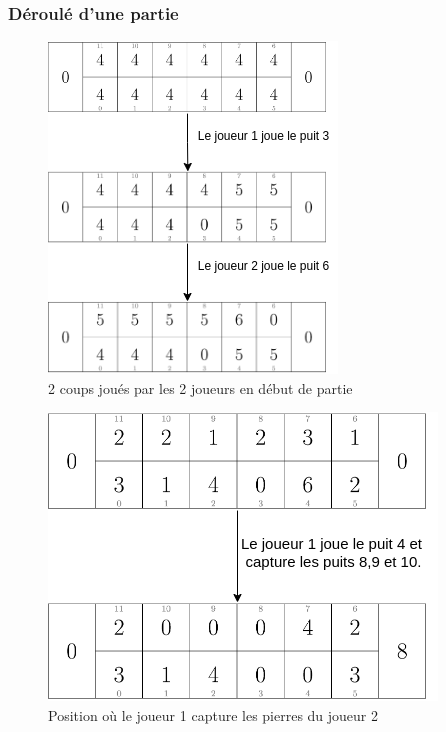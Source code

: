 \documentclass{beamer}
\begin{document}
\begin{frame}
  \frametitle{Déroulé d'une partie}
  \begin{minipage}[b]{0.45\linewidth}
    \begin{figure}
      \centering
      \includegraphics[width=1\linewidth]{ressources/diagramme1.png}
      \caption{2 coups joués par les 2 joueurs en début de partie}
    \end{figure}
  \end{minipage}
  \hfill
  \begin{minipage}[b]{0.45\linewidth}    
    \begin{figure}
      \centering
      \includegraphics[width=1\linewidth]{ressources/diagramme2.png}
      \caption{Position où le joueur 1 capture les pierres du joueur 2}
    \end{figure}
  \end{minipage}
\end{frame}
\end{document}
